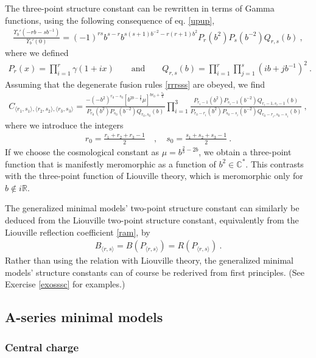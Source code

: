 \documentclass[12pt, a4paper, notitlepage, twoside]{report}
\numberwithin{equation}{section}
\theoremstyle{break}
\begin{document}
The three-point structure constant can be rewritten in terms of Gamma functions, using the following consequence of eq. \eqref{upup},
\begin{align}
 \frac{\Upsilon_b'(-rb-sb^{-1})}{\Upsilon_b'(0)} = (-1)^{rs} b^{s-r} b^{s(s+1)b^{-2}-r(r+1)b^2} P_r(b^2)P_s(b^{-2}) Q_{r,s}(b)\ ,
\end{align}
where we defined
\begin{align}
 P_r(x) = \prod_{i=1}^r \gamma(1+ix) \qquad \text{and} \qquad Q_{r,s}(b) = \prod_{i=1}^r \prod_{j=1}^s (ib+jb^{-1})^2\ .
\end{align}
Assuming that the degenerate fusion rules \eqref{rrrsss} are obeyed, we find 
\begin{align}
 C_{\langle r_1,s_1\rangle ,\langle r_2,s_2\rangle ,\langle r_3,s_3 \rangle} =  \frac{-(-b^2)^{r_0-s_0}\left[b^{2b-\frac{2}{b}}\mu\right]^{br_0 + \frac{s_0}{b}}}{P_{r_0}(b^2)P_{s_0}(b^{-2})Q_{r_0,s_0}(b)} \prod_{i=1}^3 \frac{P_{r_i-1}(b^2)P_{s_i-1}(b^{-2}) Q_{r_i-1,s_i-1}(b)}{P_{r_0-r_i}(b^2)P_{s_0-s_i}(b^{-2}) Q_{r_0-r_i,s_0-s_i}(b)} \ ,
\label{cpqb}
\end{align}
where we introduce the integers
\begin{align}
 r_0 = \frac{r_1+r_2+r_3-1}{2} \quad , \quad s_0=\frac{s_1+s_2+s_3-1}{2}\ .
\end{align}
If we choose the cosmological constant as $\mu = b^{\frac{2}{b}-2b}$, we obtain a three-point function that is manifestly meromorphic as a function of $b^2\in {\mathbb{C}}^*$.
This contrasts with the three-point function of Liouville theory, which is
meromorphic only for $b\notin i\mathbb{R}$. 

The generalized minimal models' two-point structure constant can similarly be deduced from the Liouville two-point structure constant, equivalently from the Liouville reflection coefficient \eqref{ram}, by 
\begin{align}
B_{\langle r,s\rangle} = B(P_{\langle r,s\rangle}) = R(P_{\langle r,s\rangle})\ .
\end{align}
Rather than using the relation with Liouville theory, the generalized minimal models' structure constants can of course be rederived from first principles. (See Exercise \ref{exosssc} for examples.)

\subsection{A-series minimal models \label{secamm}}

\subsubsection{Central charge}
\end{document}
